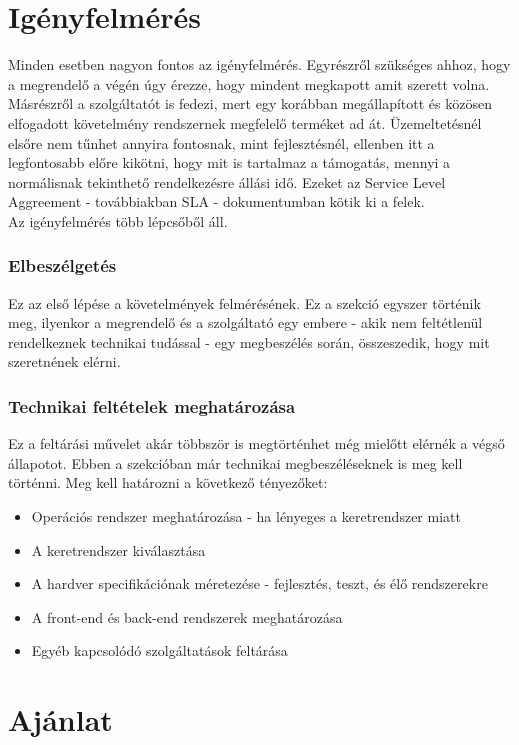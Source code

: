 \documentclass[12pt,oneside,justify,table]{book}
\begin{document}
\section{Igényfelmérés}
Minden esetben nagyon fontos az igényfelmérés. Egyrészről szükséges ahhoz, hogy a megrendelő a végén úgy érezze, hogy mindent megkapott amit szerett volna. Másrészről a szolgáltatót is fedezi, mert egy korábban megállapított és közösen elfogadott követelmény rendszernek megfelelő terméket ad át. Üzemeltetésnél elsőre nem tűnhet annyira fontosnak, mint fejlesztésnél, ellenben itt a legfontosabb előre kikötni, hogy mit is tartalmaz a támogatás, mennyi a normálisnak tekinthető rendelkezésre állási idő. Ezeket az Service Level Aggreement - továbbiakban SLA - dokumentumban kötik ki a felek. \\
Az igényfelmérés több lépcsőből áll. 
\subsubsection{Elbeszélgetés}
Ez az első lépése a követelmények felmérésének. Ez a szekció egyszer történik meg, ilyenkor a megrendelő és a szolgáltató egy embere - akik nem feltétlenül rendelkeznek technikai tudással - egy megbeszélés során, összeszedik, hogy mit szeretnének elérni. 

\subsubsection{Technikai feltételek meghatározása}
Ez a feltárási művelet akár többször is megtörténhet még mielőtt elérnék a végső állapotot. Ebben a szekcióban már technikai megbeszéléseknek is meg kell történni. 
Meg kell határozni a következő tényezőket:
\begin{itemize}
	\item Operációs rendszer meghatározása - ha lényeges a keretrendszer miatt
	\item A keretrendszer kiválasztása
	\item A hardver specifikációnak méretezése - fejlesztés, teszt, és élő rendszerekre
	\item A front-end és back-end rendszerek meghatározása
	\item Egyéb kapcsolódó szolgáltatások feltárása 
\end{itemize}


\section{Ajánlat}
\end{document}
